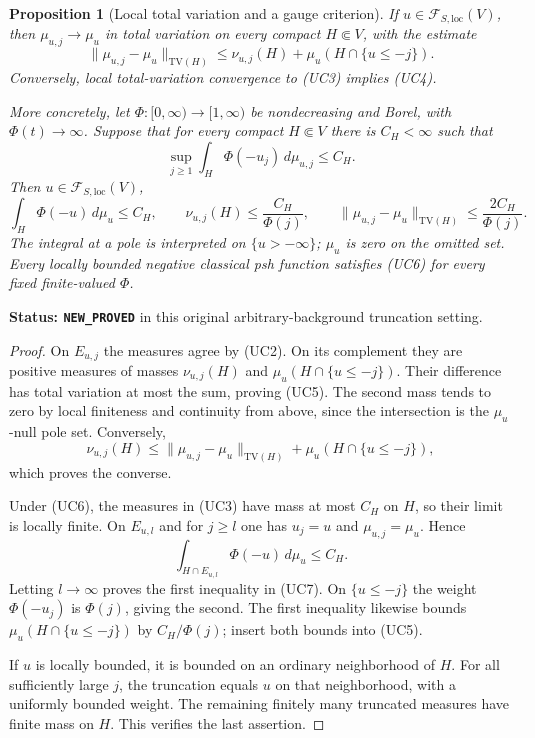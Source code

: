 \documentclass[11pt,a4paper]{article}
\numberwithin{equation}{section}
\newtheorem{proposition}[theorem]{Proposition}
\theoremstyle{definition}
\theoremstyle{remark}
\begin{document}
\begin{proposition}[Local total variation and a gauge criterion]
\label{prop:r11-loss-tv-and-gauge}
If $u\in\mathcal F_{S,\mathrm{loc}}(V)$, then
$\mu_{u,j}\to\mu_u$ in total variation on every compact
$H\Subset V$, with the estimate
\[
 \|\mu_{u,j}-\mu_u\|_{\mathrm{TV}(H)}
 \leq \nu_{u,j}(H)+\mu_u(H\cap\{u\leq-j\}).
 \tag{UC5}
\]
Conversely, local total-variation convergence to (UC3) implies
(UC4).

More concretely, let $\Phi:[0,\infty)\to[1,\infty)$ be
nondecreasing and Borel, with $\Phi(t)\to\infty$. Suppose
that for every compact $H\Subset V$ there is $C_H<\infty$ such
that
\[
       \sup_{j\geq1}\int_H\Phi(-u_j)\,d\mu_{u,j}\leq C_H.
 \tag{UC6}
\]
Then $u\in\mathcal F_{S,\mathrm{loc}}(V)$,
\[
 \int_H\Phi(-u)\,d\mu_u\leq C_H,
 \qquad
 \nu_{u,j}(H)\leq\frac{C_H}{\Phi(j)},
 \qquad
 \|\mu_{u,j}-\mu_u\|_{\mathrm{TV}(H)}
                         \leq\frac{2C_H}{\Phi(j)}.
 \tag{UC7}
\]
The integral at a pole is interpreted on $\{u> -\infty\}$;
$\mu_u$ is zero on the omitted set. Every locally bounded
negative classical psh function satisfies (UC6) for every fixed
finite-valued $\Phi$.
\end{proposition}

\noindent\textbf{Status: \texttt{NEW\_PROVED}} in this original
arbitrary-background truncation setting.

\begin{proof}
On $E_{u,j}$ the measures agree by (UC2). On its complement
they are positive measures of masses $\nu_{u,j}(H)$ and
$\mu_u(H\cap\{u\leq-j\})$. Their difference has total
variation at most the sum, proving (UC5). The second mass tends
to zero by local finiteness and continuity from above, since
the intersection is the $\mu_u$-null pole set. Conversely,
\[
 \nu_{u,j}(H)
 \leq\|\mu_{u,j}-\mu_u\|_{\mathrm{TV}(H)}
       +\mu_u(H\cap\{u\leq-j\}),
\]
which proves the converse.

Under (UC6), the measures in (UC3) have mass at most $C_H$ on
$H$, so their limit is locally finite. On $E_{u,l}$ and for
$j\geq l$ one has $u_j=u$ and
$\mu_{u,j}=\mu_u$. Hence
\[
       \int_{H\cap E_{u,l}}\Phi(-u)\,d\mu_u\leq C_H.
\]
Letting $l\to\infty$ proves the first inequality in (UC7).
On $\{u\leq-j\}$ the weight $\Phi(-u_j)$ is $\Phi(j)$,
giving the second. The first inequality likewise bounds
$\mu_u(H\cap\{u\leq-j\})$ by $C_H/\Phi(j)$; insert
both bounds into (UC5).

If $u$ is locally bounded, it is bounded on an ordinary
neighborhood of $H$. For all sufficiently large $j$, the
truncation equals $u$ on that neighborhood, with a uniformly
bounded weight. The remaining finitely many truncated measures
have finite mass on $H$. This verifies the last assertion.
\end{proof}
\end{document}

